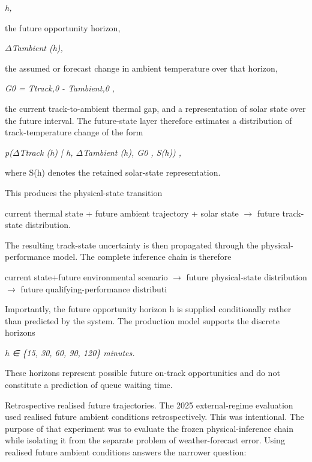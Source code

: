 \begin{center}\textit{h,}\end{center}

the future opportunity horizon,

\begin{center}\textit{\ensuremath{\Delta}Tambient (h),}\end{center}

the assumed or forecast change in ambient temperature over that horizon,

\begin{center}\textit{G0 = Ttrack,0 - Tambient,0 ,}\end{center}

the current track-to-ambient thermal gap, and a representation of solar state over the future interval. The future-state layer therefore estimates a distribution of track-temperature change of the form

\begin{center}\textit{p(\ensuremath{\Delta}Ttrack (h) | h, \ensuremath{\Delta}Tambient (h), G0 , S(h)) ,}\end{center}

where S(h) denotes the retained solar-state representation.

This produces the physical-state transition

current thermal state + future ambient trajectory + solar state \ensuremath{\rightarrow} future track-state distribution.

The resulting track-state uncertainty is then propagated through the physical-performance model. The complete inference chain is therefore

current state+future environmental scenario \ensuremath{\rightarrow} future physical-state distribution \ensuremath{\rightarrow} future qualifying-performance distributi

Importantly, the future opportunity horizon h is supplied conditionally rather than predicted by the system. The production model supports the discrete horizons

\begin{center}\textit{h ∈ \{15, 30, 60, 90, 120\} minutes.}\end{center}

These horizons represent possible future on-track opportunities and do not constitute a prediction of queue waiting time.

Retrospective realised future trajectories. The 2025 external-regime evaluation used realised future ambient conditions retrospectively. This was intentional. The purpose of that experiment was to evaluate the frozen physical-inference chain while isolating it from the separate problem of weather-forecast error. Using realised future ambient conditions answers the narrower question:

